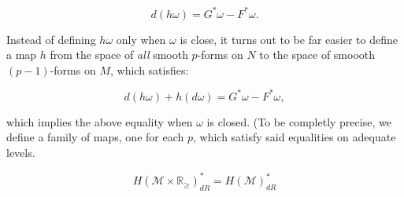\documentclass[licencjacka]{pracamgr}
\begin{document}
\[
    d(h\omega) = G^\ast \omega - F^\ast \omega.
\]

Instead of defining $h\omega$ only when $\omega$ is close, it turns
out to be far easier to define a map $h$ from the space of
\textit{all} smooth $p$-forms on $N$ to the space of smoooth
$(p-1)$-forms on $M$, which satisfies:

\[
    d(h\omega) + h(d\omega) = G^\ast \omega - F^\ast \omega ,
\]

which implies the above equality when $\omega$ is closed. (To be
completly precise, we define a family of maps, one for each $p$, which
satisfy said equalities on adequate levels.

\[
    H(\mathcal{M} \times \mathbb{R}_{\geq})_{dR}^\ast = H(\mathcal{M})_{dR}^\ast
\]

\normalsize



\end{document}

